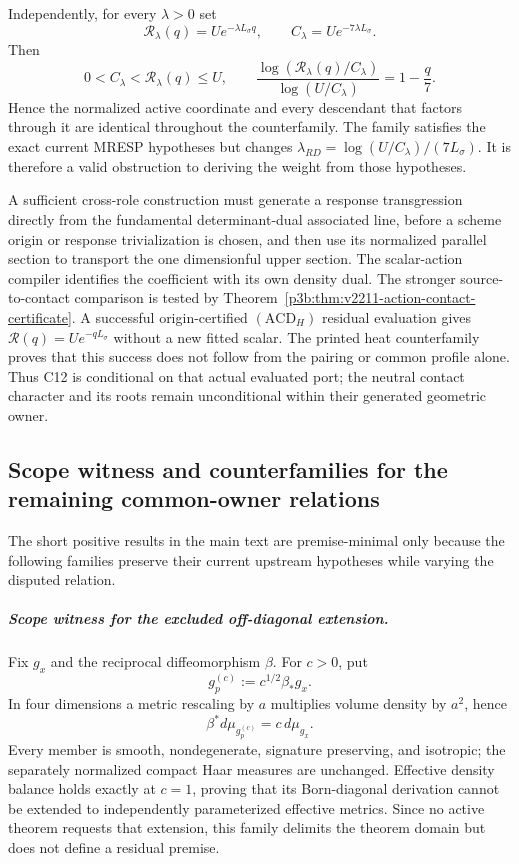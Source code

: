 \documentclass[11pt,a4paper]{article}
\begin{document}
Independently, for every $\lambda>0$ set
\[
 \mathcal R_\lambda(q)=Ue^{-\lambda L_\sigma q},
 \qquad C_\lambda=Ue^{-7\lambda L_\sigma}.
\]
Then
\[
 0<C_\lambda<\mathcal R_\lambda(q)\le U,
 \qquad
 \frac{\log(\mathcal R_\lambda(q)/C_\lambda)}
      {\log(U/C_\lambda)}=1-\frac q7.
\]
Hence the normalized active coordinate and every descendant that factors
through it are identical throughout the counterfamily.  The family satisfies
the exact current MRESP hypotheses but changes
\(
 \lambda_{RD}=\log(U/C_\lambda)/(7L_\sigma)
\).
It is therefore a valid obstruction to deriving the weight from those
hypotheses.

A sufficient cross-role construction must generate a response transgression
directly from the fundamental determinant-dual associated line, before a
scheme origin or response trivialization is chosen, and then use its
normalized parallel section to transport the one dimensionful upper section.
The scalar-action compiler identifies the coefficient with its own density
dual. The stronger source-to-contact comparison is tested by
Theorem~\ref{p3b:thm:v2211-action-contact-certificate}. A successful
origin-certified $(\mathrm{ACD}_H)$ residual evaluation gives
$\mathcal R(q)=Ue^{-qL_\sigma}$ without a new fitted scalar. The printed
heat counterfamily proves that this success does not follow from the pairing
or common profile alone. Thus C12 is conditional on that actual evaluated
port; the neutral contact character and its roots remain unconditional within
their generated geometric owner.

\subsection{Scope witness and counterfamilies for the remaining common-owner relations}
\label{p3e:app:remaining-owner-counterfamilies}
The short positive results in the main text are premise-minimal only because
the following families preserve their current upstream hypotheses while
varying the disputed relation.

\subparagraph{Scope witness for the excluded off-diagonal extension.}
Fix \(g_x\) and the reciprocal diffeomorphism \(\beta\).  For \(c>0\), put
\[
                g_p^{(c)}:=c^{1/2}\beta_*g_x.
\]
In four dimensions a metric rescaling by \(a\) multiplies volume density by
\(a^2\), hence
\[
        \beta^*d\mu_{g_p^{(c)}}=c\,d\mu_{g_x}.
\]
Every member is smooth, nondegenerate, signature preserving, and isotropic;
the separately normalized compact Haar measures are unchanged.  Effective
density balance holds exactly at \(c=1\), proving that its Born-diagonal
derivation cannot be extended to independently parameterized effective
metrics.  Since no active theorem requests that extension, this family
delimits the theorem domain but does not define a residual premise.
\end{document}
